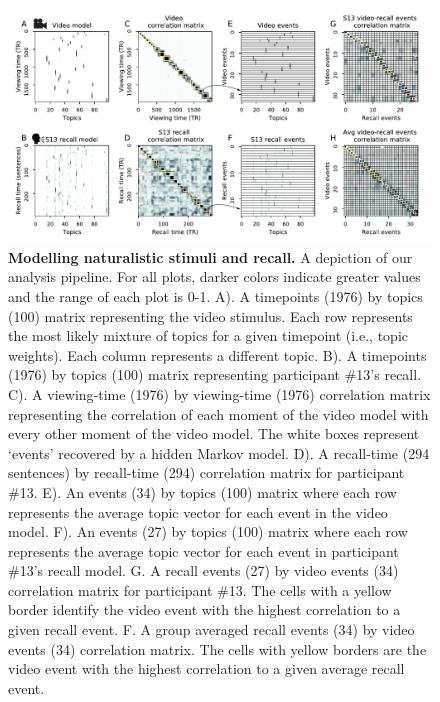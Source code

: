 \documentclass{article}
\begin{document}
\begin{figure}[ht!]
\centering
\includegraphics[width=\textwidth]{figs/2_eventseg.pdf}
\caption{\small \textbf{Modelling naturalistic stimuli and recall.} A depiction of our analysis pipeline. For all plots, darker colors indicate greater values and the range of each plot is 0-1.  A). A timepoints (1976) by topics (100) matrix representing the video stimulus.  Each row represents the most likely mixture of topics for a given timepoint (i.e., topic weights). Each column represents a different topic. B). A timepoints (1976) by topics (100) matrix representing participant \#13's recall. C). A viewing-time (1976) by viewing-time (1976) correlation matrix representing the correlation of each moment of the video model with every other moment of the video model. The white boxes represent `events' recovered by a hidden Markov model. D). A recall-time (294 sentences) by recall-time (294) correlation matrix for participant \#13. E). An events (34) by topics (100) matrix where each row represents the average topic vector for each event in the video model.  F). An events (27) by topics (100) matrix where each row represents the average topic vector for each event in participant \#13's recall model. G. A recall events (27) by video events (34) correlation matrix for participant \#13. The cells with a yellow border identify the video event with the highest correlation to a given recall event. F. A group averaged recall events (34) by video events (34) correlation matrix.  The cells with yellow borders are the video event with the highest correlation to a given average recall event.}
\label{fig:model}
\end{figure}
\end{document}
